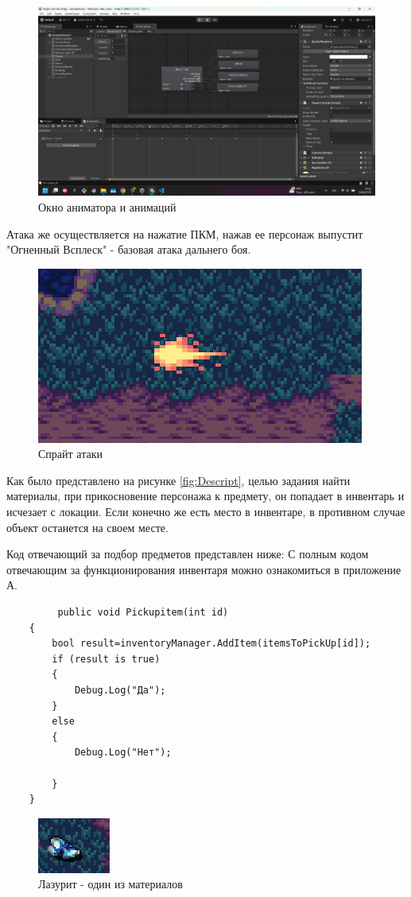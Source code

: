\documentclass[bachelor, och, coursework, times]{SCWorks}
\begin{document}
     \begin{figure} [H]
        \centering
    \includegraphics[width=0.50\linewidth]{Pictures/Снимок экрана 2025-06-24 215301.png}
    \caption{Окно аниматора и анимаций}
    \label{fig:Anim}
    \end{figure}

    Атака же осуществляется на нажатие ПКМ, нажав ее персонаж выпустит "Огненный Всплеск" - 
    базовая атака дальнего боя.


    \begin{figure} [H]
        \centering
    \includegraphics[width=0.50\linewidth]{Pictures/Снимок экрана 2025-06-24 220136.png}
    \caption{Спрайт атаки}
    \label{fig:Anim}
    \end{figure}

    Как было представлено на рисунке \ref{fig:Descript}, целью задания найти материалы,
    при прикосновение персонажа к предмету, он попадает в инвентарь и исчезает с локации.
    Если конечно же есть место в инвентаре, в противном случае объект останется на своем месте.

    Код отвечающий за подбор предметов представлен ниже:
    С полным кодом отвечающим за функционирования инвентаря можно ознакомиться в приложение А.
    \begin{verbatim}
         public void Pickupitem(int id)
    {
        bool result=inventoryManager.AddItem(itemsToPickUp[id]);
        if (result is true)
        {
            Debug.Log("Да");
        }
        else
        {
            Debug.Log("Нет");

        }
    }
    \end{verbatim}

    \begin{figure} [H]
        \centering
    \includegraphics[width=0.50\linewidth]{Pictures/Снимок экрана 2025-06-24 220509.png}
    \caption{Лазурит - один из материалов}
    \label{fig:Lazurit}
    \end{figure}
        
\end{document}
